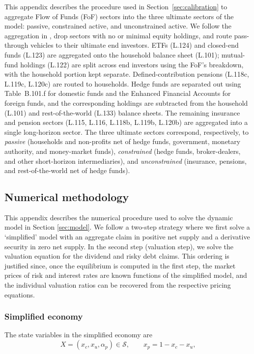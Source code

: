 This appendix describes the procedure used in Section~\ref{sec:calibration} to aggregate Flow of Funds (FoF) sectors into the three ultimate sectors of the model: passive, constrained active, and unconstrained active.
We follow the aggregation in \citet{koijen2024investors}, drop sectors with no or minimal equity holdings, and route pass-through vehicles to their ultimate end investors.
ETFs (L.124) and closed-end funds (L.123) are aggregated onto the household balance sheet (L.101); mutual-fund holdings (L.122) are split across end investors using the FoF's breakdown, with the household portion kept separate.
Defined-contribution pensions (L.118c, L.119c, L.120c) are routed to households.
Hedge funds are separated out using Table~B.101.f for domestic funds and the Enhanced Financial Accounts for foreign funds, and the corresponding holdings are subtracted from the household (L.101) and rest-of-the-world (L.133) balance sheets.
The remaining insurance and pension sectors (L.115, L.116, L.118b, L.119b, L.120b) are aggregated into a single long-horizon sector.
The three ultimate sectors correspond, respectively, to \emph{passive} (households and non-profits net of hedge funds, government, monetary authority, and money-market funds), \emph{constrained} (hedge funds, broker-dealers, and other short-horizon intermediaries), and \emph{unconstrained} (insurance, pensions, and rest-of-the-world net of hedge funds).

\subsection{Numerical methodology}\label{app:numerical}
This appendix describes the numerical procedure used to solve the dynamic model in Section \ref{sec:model}.
We follow a two-step strategy where we first solve a `simplified' model with an aggregate claim in positive net supply and a derivative security in zero net supply.
In the second step (valuation step), we solve the valuation equation for the dividend and risky debt claims.
This ordering is justified since, once the equilibrium is computed in the first step, the market prices of risk and interest rates are known functions of the simplified model, and the individual valuation ratios can be recovered from the respective pricing  equations.

\subsubsection{Simplified economy}
The state variables in the simplified economy are
\[
X=(x_c,x_u,\alpha_p)\in\mathcal S,
\qquad x_p=1-x_c-x_u,
\]

